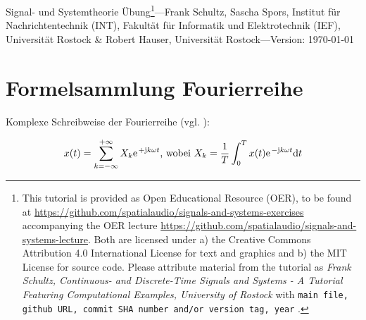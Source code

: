 \documentclass[11pt,a4paper,DIV=12]{scrartcl}
\begin{document}
\noindent Signal- und Systemtheorie Übung\footnote{This tutorial is provided as
Open Educational Resource (OER), to be found at
\url{https://github.com/spatialaudio/signals-and-systems-exercises}
accompanying the OER lecture
\url{https://github.com/spatialaudio/signals-and-systems-lecture}.
%
Both are licensed under a) the Creative Commons Attribution 4.0 International
License for text and graphics and b) the MIT License for source code.
%
Please attribute material from the tutorial as \textit{Frank Schultz,
Continuous- and Discrete-Time Signals and Systems - A Tutorial Featuring
Computational Examples, University of Rostock} with
\texttt{main file, github URL, commit SHA number and/or version tag, year}
.}---Frank Schultz, Sascha Spors,
Institut für Nachrichtentechnik (INT),
Fakultät für Informatik und Elektrotechnik (IEF),
Universität Rostock \&
Robert Hauser, Universität Rostock---Version: \today


\section*{Formelsammlung Fourierreihe}

Komplexe Schreibweise der Fourierreihe (vgl. \cite[S. 488]{Bronstein2}):

\begin{align}
	x(t)=\sum_{k=-\infty}^{+\infty}X_k\e^{+\im k \omega t}\text{, wobei }X_k=\frac{1}{T}\int_{0}^{T}x(t)\e^{-\im k \omega t}\mathrm{d}t
\end{align}
\end{document}
